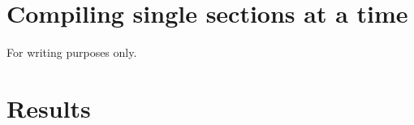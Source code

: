 \documentclass[a4paper, 12pt]{book}
\begin{document}
\chapter{Compiling single sections at a time}
For writing purposes only.

\iffalse

\chapter{Theory Part II \comment{(need to rename)}}
\comment{Describe analytical models, numerical models (omega), simulations (eris) and that I compare the two latter}
\comment{Results from omega can be compared to hydrodynamical simulations like eris. Which are much more detialed and precise, but also more computationally expensive.}
\setlength{\figwidth}{0.8\linewidth}



\fi

\iftrue

\chapter{Results}


\fi

\appendix




\end{document}
